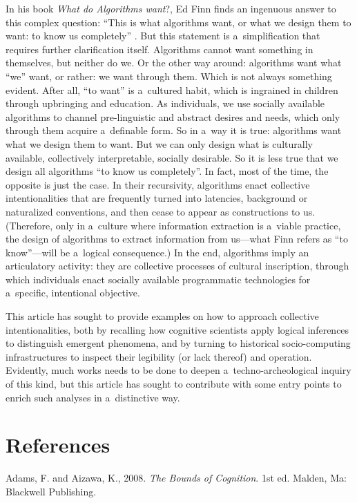 In his book \textit{What do Algorithms want}?, Ed Finn finds an ingenuous answer to this complex question: ``This is what algorithms want, or what we design them to want: to know us completely''
\parencite[][p.82]{finn_what_2017}. %
 But this statement is a~simplification that requires further clarification itself. Algorithms cannot want something in themselves, but neither do we. Or the other way around: algorithms want what ``we'' want, or rather: we want through them. Which is not always something evident. After all, ``to want'' is a~cultured habit, which is ingrained in children through upbringing and education. As individuals, we use socially available algorithms to channel pre-linguistic and abstract desires and needs, which only through them acquire a~definable form. So in a~way it is true: algorithms want what we design them to want. But we can only design what is culturally available, collectively interpretable, socially desirable. So it is less true that we design all algorithms ``to know us completely''. In fact, most of the time, the opposite is just the case. In their recursivity, algorithms enact collective intentionalities that are frequently turned into latencies, background or naturalized conventions, and then cease to appear as constructions to us. (Therefore, only in a~culture where information extraction is a~viable practice, the design of algorithms to extract information from us—what Finn refers as ``to know''—will be a~logical consequence.) In the end, algorithms imply an articulatory activity: they are collective processes of cultural inscription, through which individuals enact socially available programmatic technologies for a~specific, intentional objective.

This article has sought to provide examples on how to approach collective intentionalities, both by recalling how cognitive scientists apply logical inferences to distinguish emergent phenomena, and by turning to historical socio-computing infrastructures to inspect their legibility (or lack thereof) and operation. Evidently, much works needs to be done to deepen a~techno-archeological inquiry of this kind, but this article has sought to contribute with some entry points to enrich such analyses in a~distinctive way.

\section*{References}
Adams, F. and Aizawa, K., 2008. \textit{The Bounds of Cognition}. 1st ed. Malden, Ma: Blackwell Publishing.

